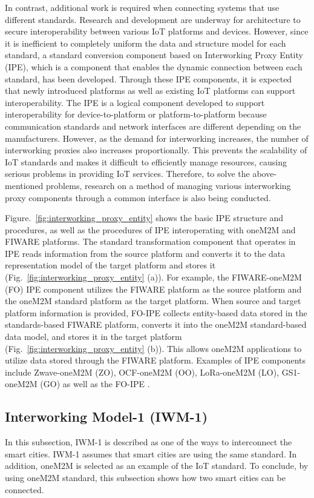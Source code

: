 In contrast, additional work is required when connecting systems that use different standards. Research and development are underway for architecture to secure interoperability between various IoT platforms and devices. However, since it is inefficient to completely uniform the data and structure model for each standard, a standard conversion component based on Interworking Proxy Entity (IPE), which is a component that enables the dynamic connection between each standard, has been developed. Through these IPE components, it is expected that newly introduced platforms as well as existing IoT platforms can support interoperability. The IPE is a logical component developed to support interoperability for device-to-platform or platform-to-platform because communication standards and network interfaces are different depending on the manufacturers. However, as the demand for interworking increases, the number of interworking proxies also increases proportionally. This prevents the scalability of IoT standards and makes it difficult to efficiently manage resources, causing serious problems in providing IoT services. Therefore, to solve the above-mentioned problems, research on a method of managing various interworking proxy components through a common interface is also being conducted.
 
Figure.~\ref{fig:interworking_proxy_entity} shows the basic IPE structure and procedures, as well as the procedures of IPE interoperating with oneM2M and FIWARE platforms. The standard transformation component that operates in IPE reads information from the source platform and converts it to the data representation model of the target platform and stores it (Fig.~\ref{fig:interworking_proxy_entity} (a)). For example, the FIWARE-oneM2M (FO) IPE component utilizes the FIWARE platform as the source platform and the oneM2M standard platform as the target platform. When source and target platform information is provided, FO-IPE collects entity-based data stored in the standards-based FIWARE platform, converts it into the oneM2M standard-based data model, and stores it in the target platform (Fig.~\ref{fig:interworking_proxy_entity} (b)). This allows oneM2M applications to utilize data stored through the FIWARE platform. Examples of IPE components include Zwave-oneM2M (ZO), OCF-oneM2M (OO), LoRa-oneM2M (LO), GS1-oneM2M (GO) as well as the FO-IPE .

\subsection{Interworking Model-1 (IWM-1)}
In this subsection, IWM-1 is described as one of the ways to interconnect the smart cities. IWM-1 assumes that smart cities are using the same standard. In addition, oneM2M is selected as an example of the IoT standard. To conclude, by using oneM2M standard, this subsection shows how two smart cities can be connected.

